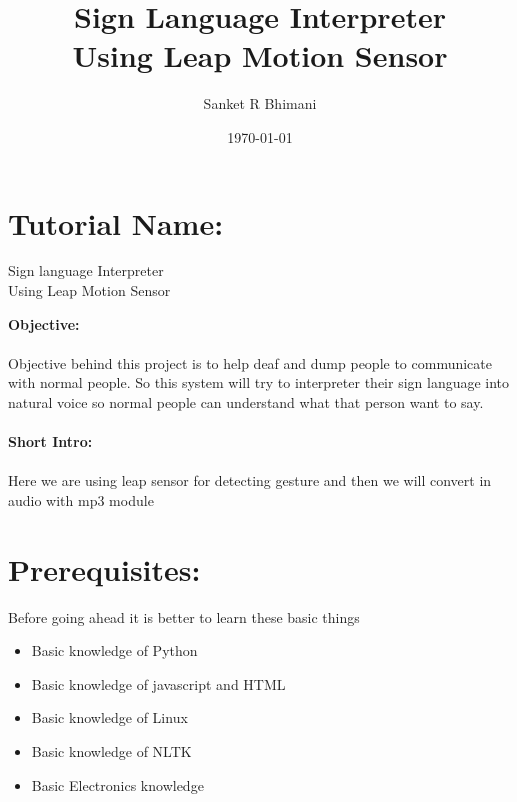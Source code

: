 \documentclass[11pt,a4paper]{article}
\title{\textbf{\Huge{Sign Language Interpreter}}\vspace{6mm}\\Using Leap Motion Sensor}
\author{Sanket R Bhimani}
\date{\today}
\newcommand\tab[1][1cm]{\hspace*{#1}}
\begin{document}
	\maketitle
	\newpage
	\tableofcontents
	\newpage
	\section{\textbf{\Huge{Tutorial Name:}}}
	\begin{center}\huge{Sign language Interpreter}\\\Large{Using Leap Motion Sensor}\end{center}
	\vspace{15mm}
	\textbf{\Large{Objective:}}\\
	\vspace{1mm}\\
	Objective behind this project is to help deaf and dump people to communicate with normal people. So this system will try to interpreter their sign language into natural voice so normal people can understand what that person want to say.\\
	\vspace{6mm}\\
	\textbf{\Large{Short Intro:}}\\
	\vspace{1mm}\\
	Here we are using leap sensor for detecting gesture and then we will convert in audio with mp3 module
	\newpage
	\section{\textbf{\Huge{Prerequisites:}}}
	\vspace{1cm}
	\tab Before going ahead it is better to learn these basic things
    \vspace{1cm}
	\begin{itemize}
	    \item Basic knowledge of Python
	    \item Basic knowledge of javascript and HTML
	    \item Basic knowledge of Linux
	    \item Basic knowledge of NLTK
	    \item Basic Electronics knowledge
	\end{itemize}
	\newpage
\end{document}
